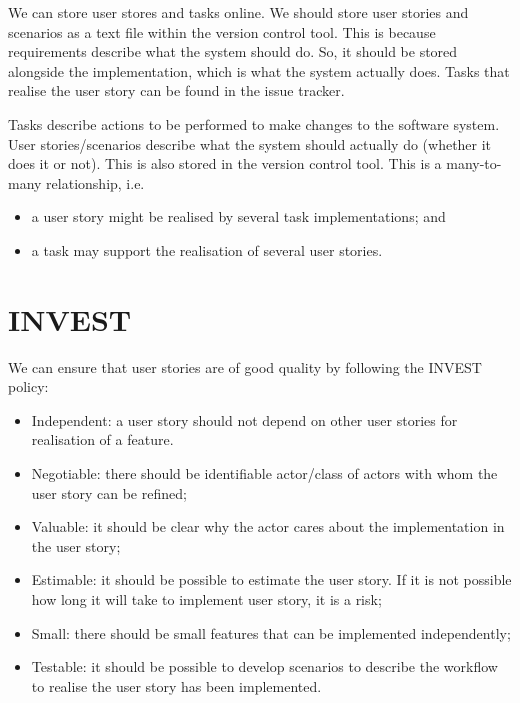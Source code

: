 \documentclass[a4paper, openany]{memoir}
\begin{document}
We can store user stores and tasks online. We should store user stories and scenarios as a text file within the version control tool. This is because requirements describe what the system should do. So, it should be stored alongside the implementation, which is what the system actually does. Tasks that realise the user story can be found in the issue tracker.

Tasks describe actions to be performed to make changes to the software system. User stories/scenarios describe what the system should actually do (whether it does it or not). This is also stored in the version control tool. This is a many-to-many relationship, i.e.
\begin{itemize}
    \item a user story might be realised by several task implementations; and
    \item a task may support the realisation of several user stories.
\end{itemize}

\section{INVEST}
We can ensure that user stories are of good quality by following the INVEST policy:
\begin{itemize}
    \item Independent: a user story should not depend on other user stories for realisation of a feature.
    \item Negotiable: there should be identifiable actor/class of actors with whom the user story can be refined;
    \item Valuable: it should be clear why the actor cares about the implementation in the user story;
    \item Estimable: it should be possible to estimate the user story. If it is not possible how long it will take to implement user story, it is a risk;
    \item Small: there should be small features that can be implemented independently;
    \item Testable: it should be possible to develop scenarios to describe the workflow to realise the user story has been implemented.
\end{itemize}
\end{document}
